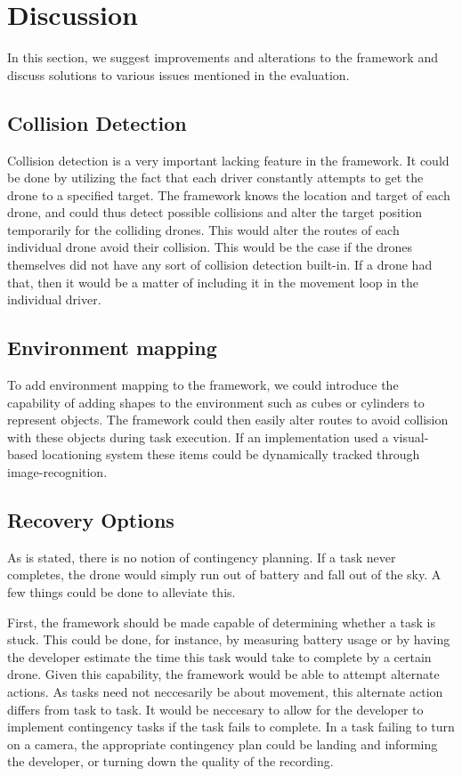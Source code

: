 \section{Discussion}
In this section, we suggest improvements and alterations to the framework and discuss solutions to various issues mentioned in the evaluation.

\subsection{Collision Detection}
Collision detection is a very important lacking feature in the framework. It could be done by utilizing the fact that each driver constantly attempts to get the drone to a specified target. The framework knows the location and target of each drone, and could thus detect possible collisions and alter the target position temporarily for the colliding drones. This would alter the routes of each individual drone avoid their collision. This would be the case if the drones themselves did not have any sort of collision detection built-in. If a drone had that, then it would be a matter of including it in the movement loop in the individual driver.

\subsection{Environment mapping}
To add environment mapping to the framework, we could introduce the capability of adding shapes to the environment such as cubes or cylinders to represent objects. The framework could then easily alter routes to avoid collision with these objects during task execution. If an implementation used a visual-based locationing system these items could be dynamically tracked through image-recognition.

\subsection{Recovery Options}
As is stated, there is no notion of contingency planning. If a task never completes, the drone would simply run out of battery and fall out of the sky. A few things could be done to alleviate this.

First, the framework should be made capable of determining whether a task is stuck. This could be done, for instance, by measuring battery usage or by having the developer estimate the time this task would take to complete by a certain drone. Given this capability, the framework would be able to attempt alternate actions. As tasks need not neccesarily be about movement, this alternate action differs from task to task. It would be neccesary to allow for the developer to implement contingency tasks if the task fails to complete. In a task failing to turn on a camera, the appropriate contingency plan could be landing and informing the developer, or turning down the quality of the recording.

